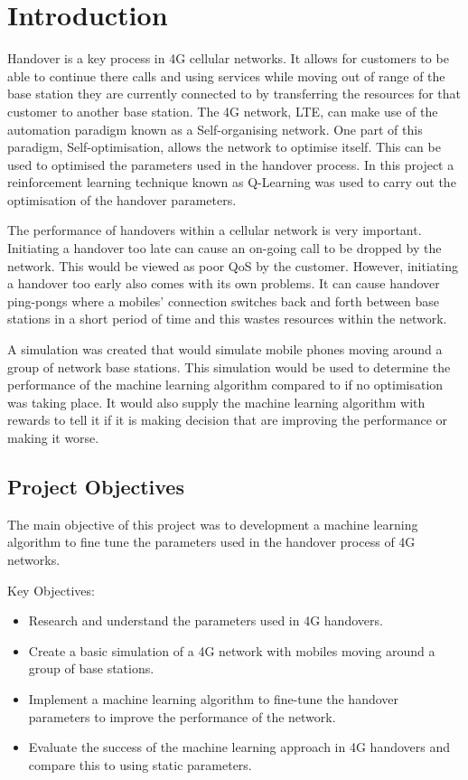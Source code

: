 \chapter{Introduction}
Handover is a key process in \ac{4G} cellular networks. It allows for customers to be able to continue there calls and using services while moving out of range of the base station they are currently connected to by transferring the resources for that customer to another base station. The 4G network, \ac{LTE}, can make use of the automation paradigm known as a Self-organising network. One part of this paradigm, Self-optimisation, allows the network to optimise itself. This can be used to optimised the parameters used in the handover process. In this project a reinforcement learning technique known as Q-Learning was used to carry out the optimisation of the handover parameters.

The performance of handovers within a cellular network is very important. Initiating a handover too late can cause an on-going call to be dropped by the network. This would be viewed as poor \ac{QoS} by the customer.  However, initiating a handover too early also comes with its own problems. It can cause handover ping-pongs where a mobiles' connection switches back and forth between base stations in a short period of time and this wastes resources within the network.  

A simulation was created that would simulate mobile phones moving around a group of network base stations. This simulation would be used to determine the performance of the machine learning algorithm compared to if no optimisation was taking place. It would also supply the machine learning algorithm with rewards to tell it if it is making decision that are improving the performance or making it worse.
\section{Project Objectives}\label{sec:obj}
The main objective of this project was to development a machine learning algorithm to fine tune the parameters used in the handover process of 4G networks.

Key Objectives:
\begin{itemize}
	\item Research and understand the parameters used in 4G handovers.
	\item Create a basic simulation of a 4G network with mobiles moving around a group of base stations.
	\item Implement a machine learning algorithm to fine-tune the handover parameters to improve the performance of the network.
	\item Evaluate the success of the machine learning approach in 4G handovers and compare this to using static parameters.
\end{itemize}

